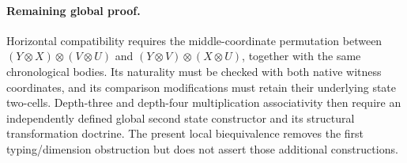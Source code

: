 \documentclass{article}
\begin{document}
\paragraph{Remaining global proof.} Horizontal compatibility requires the middle-coordinate permutation between $(Y\otimes X)\otimes(V\otimes U)$ and $(Y\otimes V)\otimes(X\otimes U)$, together with the same chronological bodies. Its naturality must be checked with both native witness coordinates, and its comparison modifications must retain their underlying state two-cells. Depth-three and depth-four multiplication associativity then require an independently defined global second state constructor and its structural transformation doctrine. The present local biequivalence removes the first typing/dimension obstruction but does not assert those additional constructions.
\end{document}
